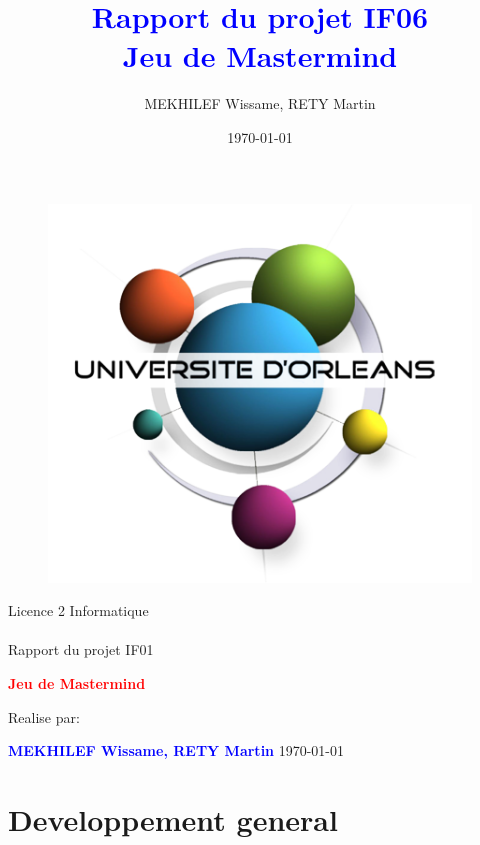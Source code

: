 \documentclass[a4paper,twoside,12pt]{report}
\title{\textcolor{blue}{\Large Rapport du projet IF06}\\\textcolor{blue}{\Large Jeu de Mastermind}}
\author{MEKHILEF Wissame, RETY Martin \date{\today}}
\begin{document}
\thispagestyle{empty}
%
\begin{figure}[H]
\includegraphics[width=0.2\linewidth]{Logo-univ-orleans.png}

\end{figure}
\vspace{2cm}
%
\begin{center}
{\Huge Licence 2 Informatique\\\ \\Rapport du projet IF01}
\par\vspace{1.4cm}

{\Huge\bf \textcolor{red}{\bf Jeu de Mastermind}}
\par\vspace{1.6cm}

{\Large Realise par:}
\par\vspace{1.3cm}
{\large\bf \textcolor{blue}{MEKHILEF Wissame, RETY Martin}}
\vfill
\today
\end{center}
\newpage
\pagestyle{fancy}

\begin{abstract}
%
\end{abstract}
 
\newpage
\tableofcontents
\listoffigures
\newpage

\chapter{Developpement general}
% 
\end{document}
